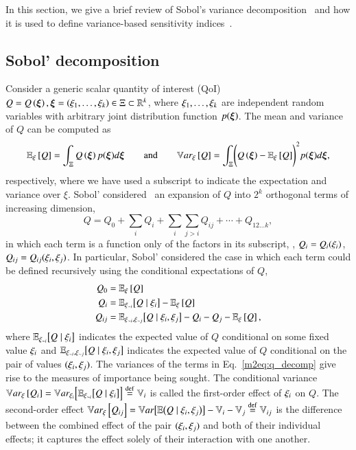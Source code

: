 In this section, we give a brief review of Sobol's variance decomposition~\cite{sobol-1993} and how it is used to define variance-based sensitivity indices~\cite{sobol-1993, homma-saltelli-1996}.

\subsection{Sobol' decomposition}
Consider a generic scalar quantity of interest (QoI) $Q = Q\left( \bm{\xi} \right), \bm{\xi} = \left( \xi_1,\ldots,\xi_k \right) \in \Xi \subset \mathbb{R}^k$, where $\xi_1,\ldots,\xi_k$ are independent random variables with arbitrary joint distribution function $p(\bm{\xi})$. 
The mean and variance of $Q$ can be computed as
\begin{equation}
    \mathbb{E}_\xi\left[Q\right] = \int_{\Xi} Q\left( \bm{\xi} \right) p(\bm{\xi}) d\bm{\xi} \qquad \text{and} \qquad \mathbb{V}ar_{\xi}\left[Q\right] = \int_{\Xi} \Biggl( Q\left( \bm{\xi} \right) - \mathbb{E}_\xi\left[Q\right] \Biggr)^2 p(\bm{\xi}) d\bm{\xi} ,
\end{equation}
respectively, where we have used a subscript to indicate the expectation and variance over $\xi$. 
Sobol' considered~\cite{sobol-1993} an expansion of $Q$ into $2^k$ orthogonal terms of increasing dimension, 
\begin{equation} \label{m2eq:q_decomp}
    Q = Q_0 + \sum_i Q_i + \sum_i \sum_{j > i} Q_{ij} + \cdots + Q_{12 \ldots k} ,
\end{equation}
in which each term is a function only of the factors in its subscript, \ie, $Q_i = Q_i(\xi_{i})$, $Q_{ij} = Q_{ij}(\xi_{i}, \xi_{j})$.
In particular, Sobol' considered the case in which each term could be defined recursively using the conditional expectations of $Q$,
\begin{align}
    Q_0 &= \mathbb{E}_\xi\left[Q\right] \\
    Q_i &= \mathbb{E}_{\xi_{\sim i}} \bigl[ Q \mid \xi_{i} \bigr] - \mathbb{E}_\xi\left[Q\right] \\
    Q_{ij} &= \mathbb{E}_{\xi_{\sim i},\xi_{\sim j}} \bigl[ Q \mid \xi_{i}, \xi_{j} \bigr] - Q_i - Q_j - \mathbb{E}_\xi\left[Q\right] ,
\end{align}
where $\mathbb{E}_{\xi_{\sim i}} \bigl[ Q \mid \xi_{i} \bigr]$ indicates the expected value of $Q$ conditional on some fixed value $\xi_{i}$ and $\mathbb{E}_{\xi_{\sim i},\xi_{\sim j}} \bigl[ Q \mid \xi_{i}, \xi_{j} \bigr]$ indicates the expected value of $Q$ conditional on the pair of values $(\xi_{i}, \xi_{j})$. 
The variances of the terms in Eq.~\eqref{m2eq:q_decomp} give rise to the measures of importance being sought. 
The conditional variance $\mathbb{V}ar_{\xi}\left[Q_i\right] = \mathbb{V}ar_{\xi_{i}} \Bigl[ \mathbb{E}_{\xi_{\sim i}}\bigl[ Q \mid \xi_{i} \bigr] \Bigr] \overset{\operatorname{def}}{=} \mathbb{V}_{i}$ is called the first-order effect of $\xi_{i}$ on $Q$.
The second-order effect $\mathbb{V}ar_{\xi}\left[Q_{ij}\right] = \mathbb{V}ar\bigl[ \mathbb{E}\bigl(Q \mid \xi_{i}, \xi_{j}\bigr) \bigr] - \mathbb{V}_{i} - \mathbb{V}_{j} \overset{\operatorname{def}}{=} \mathbb{V}_{ij}$ is the difference between the combined effect of the pair $(\xi_{i},\xi_{j})$ and both of their individual effects; it captures the effect solely of their interaction with one another.
